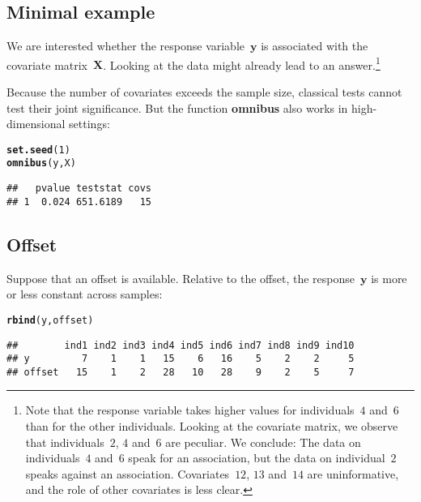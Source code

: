 \documentclass{article}\usepackage[]{graphicx}\usepackage[]{color}
\makeatletter
\newcommand{\hlnum}[1]{\textcolor[rgb]{0.686,0.059,0.569}{#1}}%
\newcommand{\hlstd}[1]{\textcolor[rgb]{0.345,0.345,0.345}{#1}}%
\newcommand{\hlkwd}[1]{\textcolor[rgb]{0.737,0.353,0.396}{\textbf{#1}}}%
\newenvironment{kframe}{%
 \def\at@end@of@kframe{}%
 \ifinner\ifhmode%
  \def\at@end@of@kframe{\end{minipage}}%
  \begin{minipage}{\columnwidth}%
 \fi\fi%
 \def\FrameCommand##1{\hskip\@totalleftmargin \hskip-\fboxsep
 \colorbox{shadecolor}{##1}\hskip-\fboxsep
     \hskip-\linewidth \hskip-\@totalleftmargin \hskip\columnwidth}%
 \MakeFramed {\advance\hsize-\width
   \@totalleftmargin\z@ \linewidth\hsize
   \@setminipage}}%
 {\par\unskip\endMakeFramed%
 \at@end@of@kframe}
\newenvironment{knitrout}{}{} %
\makeatother
\begin{document}
\subsection{Minimal example}
\label{omnibus_minimal_example}

We are interested whether the response variable~$\boldsymbol{y}$ is associated with the covariate matrix~$\boldsymbol{X}$. Looking at the data might already lead to an answer.\footnote{Note that the response variable takes higher values for individuals~$4$ and~$6$ than for the other individuals. Looking at the covariate matrix, we observe that individuals~$2$, $4$ and~$6$ are peculiar.
We conclude: The data on individuals~$4$ and~$6$ speak for an association, but the data on individual~$2$ speaks against an association. Covariates~$12$, $13$ and~$14$ are uninformative, and the role of other covariates is less clear.}

Because the number of covariates exceeds the sample size, classical tests cannot test their joint significance. But the function \textbf{omnibus} also works in high-dimensional settings:
\begin{knitrout}
\color{fgcolor}\begin{kframe}
\begin{alltt}
\hlkwd{set.seed}\hlstd{(}\hlnum{1}\hlstd{)}
\hlkwd{omnibus}\hlstd{(y,X)}
\end{alltt}
\begin{verbatim}
##   pvalue teststat covs
## 1  0.024 651.6189   15
\end{verbatim}
\end{kframe}
\end{knitrout}

\newpage

\subsection{Offset}
\label{omnibus_offset}

Suppose that an offset is available. Relative to the offset, the response~$\boldsymbol{y}$ is more or less constant across samples:
\begin{knitrout}
\color{fgcolor}\begin{kframe}
\begin{alltt}
\hlkwd{rbind}\hlstd{(y,offset)}
\end{alltt}
\begin{verbatim}
##        ind1 ind2 ind3 ind4 ind5 ind6 ind7 ind8 ind9 ind10
## y         7    1    1   15    6   16    5    2    2     5
## offset   15    1    2   28   10   28    9    2    5     7
\end{verbatim}
\end{kframe}
\end{knitrout}
\end{document}
